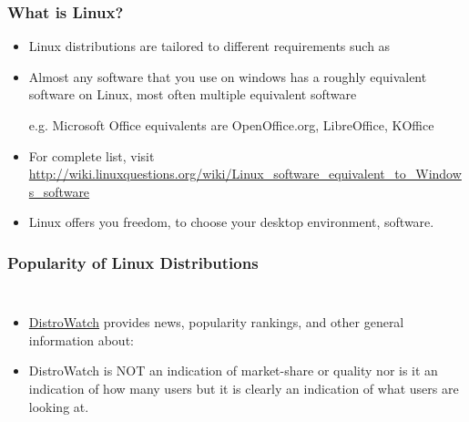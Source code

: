 \documentclass[10pt,t]{beamer}
\begin{document}
\begin{frame}
  \frametitle{What is Linux?}
  \begin{itemize}
    \item Linux distributions are tailored to different requirements such as
    \item Almost any software that you use on windows has a roughly equivalent software on Linux, most often multiple equivalent software
    \item[e.g.] Microsoft Office equivalents are OpenOffice.org, LibreOffice, KOffice
    \item For complete list, visit \url{http://wiki.linuxquestions.org/wiki/Linux_software_equivalent_to_Windows_software}
    \item Linux offers you freedom, to choose your desktop environment, software.
  \end{itemize}
\end{frame}

\begin{frame}[fragile]
  \frametitle{Popularity of Linux Distributions}
  \begin{columns}[T]
    \begin{itemize}
      \item \href{http://distrowatch.com/}{\color{blue}DistroWatch} provides news, popularity rankings, and other general information about:
      \item DistroWatch is NOT an indication of market-share or quality nor is it an indication of how many users but  it is clearly an indication of what users are looking at.
    \end{itemize}
    
  \end{columns}
\end{frame}
\end{document}
